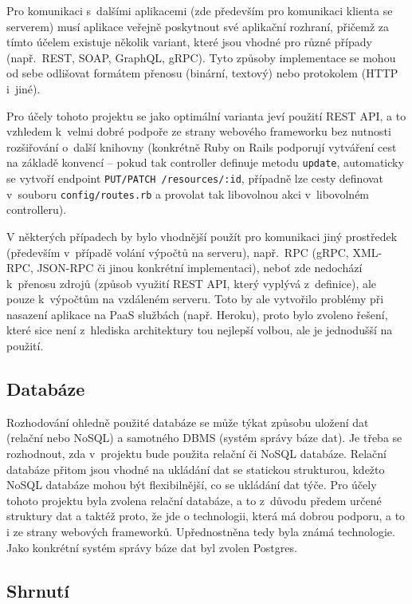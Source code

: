 \documentclass[twoside]{ctuthesis}
\begin{document}
Pro komunikaci s~dalšími aplikacemi (zde především pro komunikaci klienta se serverem) musí aplikace veřejně poskytnout své aplikační rozhraní, přičemž za tímto účelem existuje několik variant, které jsou vhodné pro různé případy (např.~REST, SOAP, GraphQL, gRPC). Tyto způsoby implementace se mohou od sebe odlišovat formátem přenosu (binární, textový) nebo protokolem (HTTP i~jiné).

Pro účely tohoto projektu se jako optimální varianta jeví použití REST API, a to vzhledem k~velmi dobré podpoře ze strany webového frameworku bez nutnosti rozšiřování o~další knihovny (konkrétně Ruby on Rails podporují vytváření cest na základě konvencí – pokud tak controller definuje metodu \texttt{update}, automaticky se vytvoří endpoint \texttt{PUT/PATCH /resources/:id}, případně lze cesty definovat v~souboru \texttt{config/routes.rb} a provolat tak libovolnou akci v~libovolném controlleru).

V některých případech by bylo vhodnější použít pro komunikaci jiný prostředek (především v~případě volání výpočtů na serveru), např.~RPC (gRPC, XML-RPC, JSON-RPC či jinou konkrétní implementaci), neboť zde nedochází k~přenosu zdrojů (způsob využití REST API, který vyplývá z~definice), ale pouze k~výpočtům na vzdáleném serveru. Toto by ale vytvořilo problémy při nasazení aplikace na PaaS službách (např. Heroku), proto bylo zvoleno řešení, které sice není z~hlediska architektury tou nejlepší volbou, ale je jednodušší na použití.

\subsection{Databáze}

Rozhodování ohledně použité databáze se může týkat způsobu uložení dat (relační nebo NoSQL) a samotného DBMS (systém správy báze dat). Je třeba se rozhodnout, zda v~projektu bude použita relační či NoSQL databáze. Relační databáze přitom jsou vhodné na ukládání dat se statickou strukturou, kdežto NoSQL databáze mohou být flexibilnější, co se ukládání dat týče.  \cite{geeks2020difference} Pro účely tohoto projektu byla zvolena relační databáze, a to z~důvodu předem určené struktury dat a taktéž proto, že jde o technologii, která má dobrou podporu, a to i ze strany webových frameworků. Upřednostněna tedy byla známá technologie. Jako konkrétní systém správy báze dat byl zvolen Postgres.


\subsection{Shrnutí}
\end{document}
